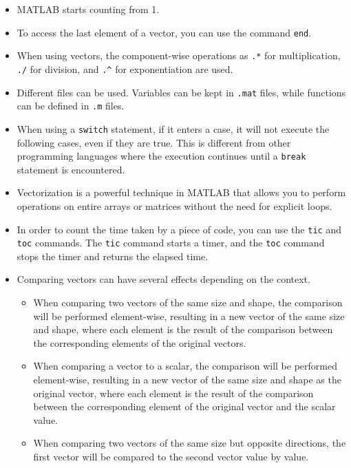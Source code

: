 \begin{itemize}
    \item MATLAB starts counting from 1.
    \item To access the last element of a vector, you can use the command \texttt{end}.
    \item When using vectors, the component-wise operations as \texttt{.*} for multiplication, \texttt{./} for division, and \texttt{.\^} for exponentiation are used.
    \item Different files can be used. Variables can be kept in \texttt{.mat} files, while functions can be defined in \texttt{.m} files.
    \item When using a \texttt{switch} statement, if it enters a case, it will not execute the following cases, even if they are true. This is different from other programming languages where the execution continues until a \texttt{break} statement is encountered.
    \item Vectorization is a powerful technique in MATLAB that allows you to perform operations on entire arrays or matrices without the need for explicit loops.
    \item In order to count the time taken by a piece of code, you can use the \texttt{tic} and \texttt{toc} commands. The \texttt{tic} command starts a timer, and the \texttt{toc} command stops the timer and returns the elapsed time.
    \item Comparing vectors can have several effects depending on the context.
    \begin{itemize}
        \item When comparing two vectors of the same size and shape, the comparison will be performed element-wise, resulting in a new vector of the same size and shape, where each element is the result of the comparison between the corresponding elements of the original vectors.
        \item When comparing a vector to a scalar, the comparison will be performed element-wise, resulting in a new vector of the same size and shape as the original vector, where each element is the result of the comparison between the corresponding element of the original vector and the scalar value.
        \item When comparing two vectors of the same size but opposite directions, the first vector will be compared to the second vector value by value.
    \end{itemize}
\end{itemize}


